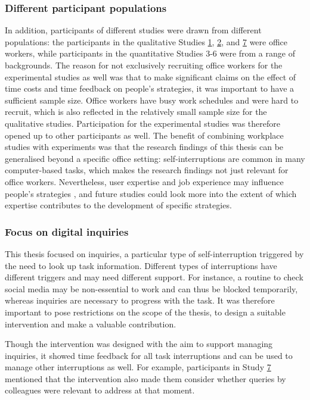 \subsubsection{Different participant populations}
In addition, participants of different studies were drawn from different populations: the participants in the qualitative Studies \hyperref[st:Study1]{1}, \hyperref[st:Study2]{2}, and \hyperref[st:Study7]{7} were office workers, while participants in the quantitative Studies 3-6 were from a range of backgrounds. The reason for not exclusively recruiting office workers for the experimental studies as well was that to make significant claims on the effect of time costs and time feedback on people's strategies, it was important to have a sufficient sample size. Office workers have busy work schedules and were hard to recruit, which is also reflected in the relatively small sample size for the qualitative studies. Participation for the experimental studies was therefore opened up to other participants as well. The benefit of combining workplace studies with experiments was that the research findings of this thesis can be generalised beyond a specific office setting: self-interruptions are common in many computer-based tasks, which makes the research findings not just relevant for office workers. Nevertheless, user expertise and job experience may influence people's strategies \citep{Weir2007}, and future studies could look more into the extent of which expertise contributes to the development of specific strategies. 

\subsubsection{Focus on digital inquiries}
This thesis focused on inquiries, a particular type of self-interruption triggered by the need to look up task information. Different types of interruptions have different triggers and may need different support. For instance, a routine to check social media may be non-essential to work and can thus be blocked temporarily, whereas inquiries are necessary to progress with the task. It was therefore important to pose restrictions on the scope of the thesis, to design a suitable intervention and make a valuable contribution. 

Though the intervention was designed with the aim to support managing inquiries, it showed time feedback for all task interruptions and can be used to manage other interruptions as well. For example, participants in Study \hyperref[st:Study7]{7} mentioned that the intervention also made them consider whether queries by colleagues were relevant to address at that moment.

